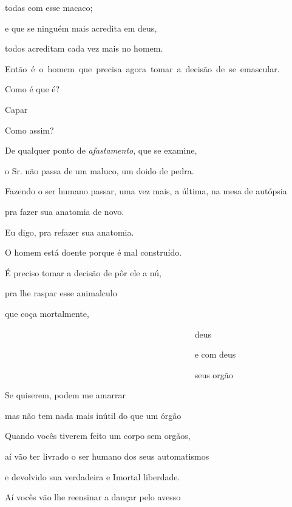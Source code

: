 todas com esse macaco;

e que se ninguém mais acredita em deus,

todos acreditam cada vez mais no homem.

\mbox{Então é o homem que precisa agora tomar a decisão de se emascular.}



Como é que é?


Capar


Como assim?

De qualquer ponto de \emph{afastamento}, que se examine,

o Sr. não passa de um maluco, um doido de pedra.


Fazendo o ser humano passar, uma vez mais, a última, na mesa de autópsia

pra fazer sua anatomia de novo.



Eu digo, pra refazer sua anatomia.

O homem está doente porque é mal construído.

É preciso tomar a decisão de pôr ele a nú,

pra lhe raspar esse animalculo

que coça mortalmente,

~~~~~~~~~~~~~~~~~~~~~~~~~~~~~~~~~~~~~~~~~~~~ deus \EP[2]

~~~~~~~~~~~~~~~~~~~~~~~~~~~~~~~~~~~~~~~~~~~~ e com deus

~~~~~~~~~~~~~~~~~~~~~~~~~~~~~~~~~~~~~~~~~~~~ seus orgão

Se quiserem, podem me amarrar

mas não tem nada mais inútil do que um órgão


Quando vocês tiverem feito um corpo sem orgãos,

aí vão ter livrado o ser humano dos seus automatismos

e devolvido sua verdadeira e Imortal liberdade.

Aí vocês vão lhe reensinar a dançar pelo avesso

